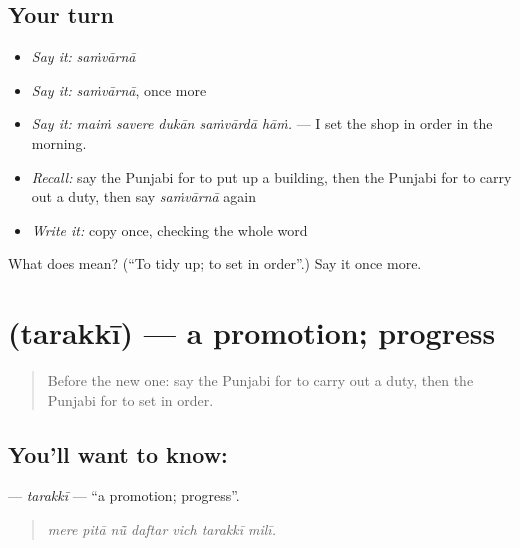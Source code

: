 \subsection*{Your turn}
\begin{itemize}
\raggedright
  \item \emph{Say it:} \emph{saṁvārnā}
  \item \emph{Say it:} \emph{saṁvārnā}, once more
  \item \emph{Say it:} \emph{maiṁ savere dukān saṁvārdā hāṁ.} — I set the shop in order in the morning.
  \item \emph{Recall:} say the Punjabi for to put up a building, then the Punjabi for to carry out a duty, then say \emph{saṁvārnā} again
  \item \emph{Write it:} copy \textbf{} once, checking the whole word
\end{itemize}

\begin{tcolorbox}[breakable,colback=teal!4,colframe=teal!35!black,title={Before you move on}]
What does  mean? (\textquotedblleft{}To tidy up; to set in order\textquotedblright{}.) Say it once more.
\end{tcolorbox}
\section[\texorpdfstring{\pa{ਤਰੱਕੀ} (tarakkī)}{ਤਰੱਕੀ (tarakkī)}]{ (tarakkī) — a promotion; progress}

\label{lesson:PA-C363-tarakki}



\begin{quote}
Before the new one: say the Punjabi for to carry out a duty, then the Punjabi for to set in order.
\end{quote}

\subsection*{You'll want to know: }
\textbf{} — \emph{tarakkī} — \textquotedblleft{}a promotion; progress\textquotedblright{}.

\begin{quote}
      
\end{quote}

\begin{quote}
\emph{mere pitā nū̃ daftar vich tarakkī milī.}
\end{quote}


